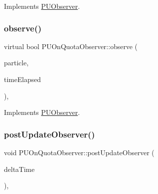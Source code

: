 Implements \hyperlink{classPUObserver_a50f59cc3245e291b641463db5d3037f7}{P\+U\+Observer}.

\mbox{\label{classPUOnQuotaObserver_aa0d90169df0c2b2c2cf0d3021c3b674a}} 
\subsubsection{\texorpdfstring{observe()}{observe()}\hspace{0.1cm}{\footnotesize\ttfamily [2/2]}}
{\footnotesize\ttfamily virtual bool P\+U\+On\+Quota\+Observer\+::observe (\begin{DoxyParamCaption}\item[{\hyperlink{structPUParticle3D}{P\+U\+Particle3D} $\ast$}]{particle,  }\item[{float}]{time\+Elapsed }\end{DoxyParamCaption})\hspace{0.3cm}{\ttfamily [override]}, {\ttfamily [virtual]}}







Implements \hyperlink{classPUObserver_a50f59cc3245e291b641463db5d3037f7}{P\+U\+Observer}.

\mbox{\label{classPUOnQuotaObserver_ab6c30a87b03d57da5ec47a66486c5827}} 
\subsubsection{\texorpdfstring{post\+Update\+Observer()}{postUpdateObserver()}\hspace{0.1cm}{\footnotesize\ttfamily [1/2]}}
{\footnotesize\ttfamily void P\+U\+On\+Quota\+Observer\+::post\+Update\+Observer (\begin{DoxyParamCaption}\item[{float}]{delta\+Time }\end{DoxyParamCaption})\hspace{0.3cm}{\ttfamily [override]}, {\ttfamily [virtual]}}







